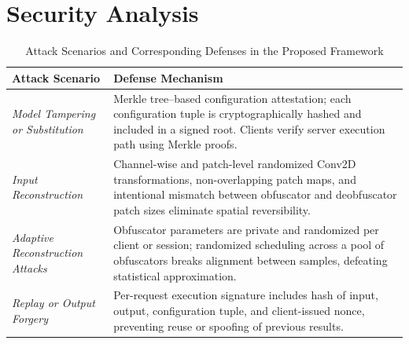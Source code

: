 \documentclass{ieeeaccess}
\begin{document}


\section{Security Analysis} \label{sec:sec}

\begin{table}[t]
\centering
\caption{Attack Scenarios and Corresponding Defenses in the Proposed Framework}
\label{tab:threat-defense}
\begin{tabular}{p{} p{}}
\toprule

\textbf{Attack Scenario} & \textbf{Defense Mechanism} \\

\midrule

\textit{Model Tampering or Substitution} &
Merkle tree--based configuration attestation; each configuration tuple is cryptographically hashed and included in a signed root. Clients verify server execution path using Merkle proofs. \\

\midrule

\textit{Input Reconstruction} &
Channel-wise and patch-level randomized Conv2D transformations, non-overlapping patch maps, and intentional mismatch between obfuscator and deobfuscator patch sizes eliminate spatial reversibility. \\

\midrule

\textit{Adaptive Reconstruction Attacks} &
Obfuscator parameters are private and randomized per client or session; randomized scheduling across a pool of obfuscators breaks alignment between samples, defeating statistical approximation. \\

\midrule

\textit{Replay or Output Forgery} &
Per-request execution signature includes hash of input, output, configuration tuple, and client-issued nonce, preventing reuse or spoofing of previous results. \\


\end{tabular}
\end{table}
\end{document}
